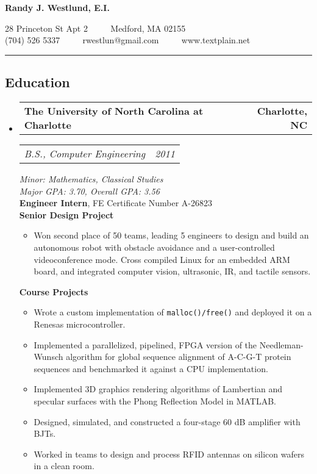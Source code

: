 \documentclass[10pt,letterpaper]{article}
\newcommand{\headerrow}[2]{%
    \begin{tabularx}{\linewidth}{Xr}
	    #1 & #2 \\
    \end{tabularx}
}
\begin{document}
\begin{center}
{\LARGE \textbf{Randy J. Westlund, E.I.}}

28 Princeton St Apt 2 \ \ \textbullet%
    \ \ Medford, MA 02155 \\
(704) 526 5337 \ \ \textbullet%
    \ \ rwestlun@gmail.com \ \ \textbullet%
    \ \ www.textplain.net
\end{center}

\hrule
\vspace{-0.4em}
\subsection*{Education}
\begin{itemize}
	\parskip=0.1em
	\item
	\headerrow{\textbf{The University of North Carolina at Charlotte}}
		{\textbf{Charlotte, NC}}
	\headerrow{\textit{B.S., Computer Engineering}}{\textit{2011}}
		\textit{Minor: Mathematics, Classical Studies} \\
        \textit{Major GPA\@: 3.70, Overall GPA\@: 3.56} \\
        \textbf{Engineer Intern},  FE Certificate Number A-26823 \\
        \textbf{Senior Design Project}
        \begin{itemize}
            \item Won second place of 50 teams, leading 5 engineers to design
                and build an autonomous robot with obstacle avoidance and a
                user-controlled videoconference mode.  Cross compiled Linux for
                an embedded ARM board, and integrated computer vision,
                ultrasonic, IR, and tactile sensors.
        \end{itemize}
    \textbf{Course Projects}
    \begin{itemize}
        \item Wrote a custom implementation of \texttt{malloc()/free()} %
            and deployed it on a Renesas microcontroller.

        \item Implemented a parallelized, pipelined, FPGA version of the
            Needleman-Wunsch algorithm for global sequence alignment of A-C-G-T
            protein sequences and benchmarked it against a CPU implementation.

        \item Implemented 3D graphics rendering algorithms of Lambertian and
            specular surfaces with the Phong Reflection Model in MATLAB\@.

        \item Designed, simulated, and constructed a four-stage 60 dB amplifier
            with BJTs.

        \item Worked in teams to design and process RFID antennas on silicon
            wafers in a clean room.
    \end{itemize}
\end{itemize}
\end{document}
